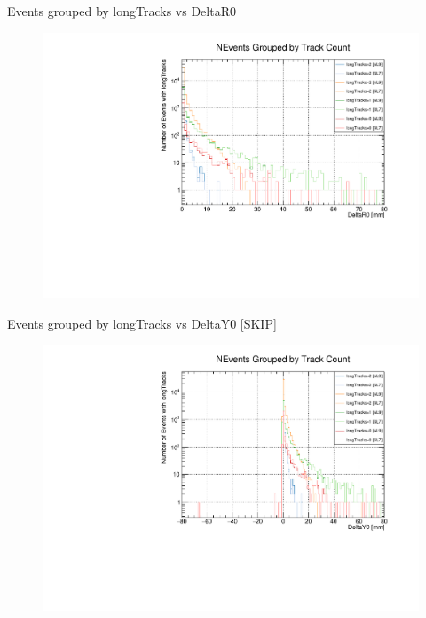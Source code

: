 \begin{frame}{Events grouped by longTracks vs DeltaR0 }
    \begin{figure}
        \includegraphics[width=\linewidth]{./output/DeltaR0_all.pdf}
    \end{figure}
\end{frame}

\begin{frame}{Events grouped by longTracks vs DeltaY0 [SKIP]}
    \begin{figure}
        \includegraphics[width=\linewidth]{./output/DeltaY0_all.pdf}
    \end{figure}
\end{frame}

